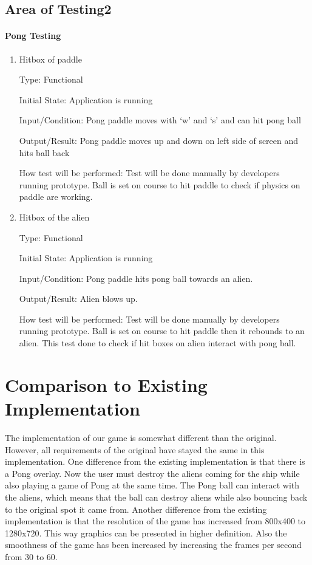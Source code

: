\documentclass[12pt, titlepage]{article}
\begin{document}
\subsection{Area of Testing2}

\paragraph{Pong Testing}

\begin{enumerate}

\item{Hitbox of paddle\\}

Type: Functional

Initial State: Application is running

Input/Condition: Pong paddle moves with ‘w’ and ‘s’ and can hit pong ball

Output/Result: Pong paddle moves up and down on left side of screen and hits ball back

How test will be performed: Test will be done manually by developers running prototype. Ball is set on course to hit paddle to check if physics on paddle are working.


\item{Hitbox of the alien\\}

Type: Functional

Initial State: Application is running

Input/Condition: Pong paddle hits pong ball towards an alien.

Output/Result: Alien blows up.

How test will be performed: Test will be done manually by developers running prototype. Ball is set on course to hit paddle then it rebounds to an alien. This test done to check if hit boxes on alien interact with pong ball.

\end{enumerate}
	
\section{Comparison to Existing Implementation}	
The implementation of our game is somewhat different than the original. However, all requirements of the original have stayed the same in this implementation. 
One difference from the existing implementation is that there is a Pong overlay. Now the user must destroy the aliens coming for the ship while also playing a 
game of Pong at the same time. The Pong ball can interact with the aliens, which means that the ball can destroy aliens while also bouncing back to the original 
spot it came from. Another difference from the existing implementation is that the resolution of the game has increased from 800x400 to 1280x720. 
This way graphics can be presented in higher definition. Also the smoothness of the game has been increased by increasing the frames per second from 30 to 60.
				
\end{document}
